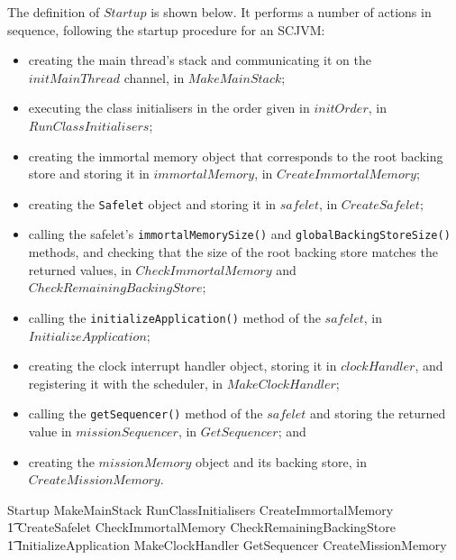 The definition of $Startup$ is shown below.
It performs a number of actions in sequence, following the startup procedure for an SCJVM:
\begin{itemize}
\item creating the main thread's stack and communicating it on the
  $initMainThread$ channel, in $MakeMainStack$;
\item executing the class initialisers in the order given in
  $initOrder$, in $RunClassInitialisers$;
\item creating the immortal memory object that corresponds to the root
  backing store and storing it in $immortalMemory$, in
  $CreateImmortalMemory$;
\item creating the \texttt{Safelet} object and storing it in
  $safelet$, in $CreateSafelet$;
\item calling the safelet's \texttt{immortalMemorySize()} and
  \texttt{globalBackingStoreSize()} methods, and checking that the
  size of the root backing store matches the returned values,
  in $CheckImmortalMemory$ and $CheckRemainingBackingStore$;
\item calling the \texttt{initializeApplication()} method of the
  $safelet$, in $InitializeApplication$;
\item creating the clock interrupt handler object, storing it in
  $clockHandler$, and registering it with the scheduler, in
  $MakeClockHandler$;
\item calling the \texttt{getSequencer()} method of the $safelet$ and
  storing the returned value in $missionSequencer$, in $GetSequencer$;
  and
\item creating the $missionMemory$ object and its backing store, in
  $CreateMissionMemory$.
\end{itemize}
\begin{circusaction}
  Startup \circdef MakeMainStack \circseq RunClassInitialisers \circseq CreateImmortalMemory \circseq \\
  \t1 CreateSafelet \circseq CheckImmortalMemory \circseq CheckRemainingBackingStore \circseq \\
  \t1 InitializeApplication \circseq MakeClockHandler \circseq GetSequencer \circseq CreateMissionMemory
\end{circusaction}

